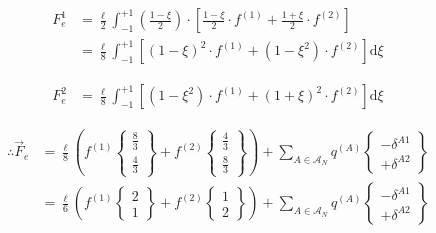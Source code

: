 \begin{equation}%
\begin{aligned}
F_e^1 &= \frac{\ell}{2} \int_{-1}^{+1} \left(\frac{1-\xi}{2}\right) \cdot \left[
	\frac{1-\xi}{2}\cdot f^{(1)}
	+ \frac{1+\xi}{2}\cdot f^{(2)}
\right] \\
&= \frac{\ell}{8} \int_{-1}^{+1} \left[
	\left(1-\xi\right)^2\cdot f^{(1)}
	+ \left(1-\xi^2\right)\cdot f^{(2)}
\right] \text{d} \xi
\end{aligned}
\end{equation}

\begin{equation}%
\begin{aligned}
F_e^2 &= \frac{\ell}{8} \int_{-1}^{+1} \left[
	(1-\xi^2)\cdot f^{(1)} + (1+\xi)^2\cdot f^{(2)}
\right] \text{d}\xi
\end{aligned}
\end{equation}



\begin{equation}%
\begin{aligned}
\therefore \vec{F}_e &= \frac{\ell}{8} \left(
	f^{(1)} \begin{Bmatrix} \frac{8}{3} \\ \frac{4}{3} \end{Bmatrix}
	+ f^{(2)} \begin{Bmatrix} \frac{4}{3} \\ \frac{8}{3} \end{Bmatrix}
\right)
+ \sum_{A \in \mathcal{A}_N} q^{(A)} \begin{Bmatrix} -\delta^{A1} \\ +\delta^{A2} \end{Bmatrix} \\
&= \frac{\ell}{6} \left(
	f^{(1)} \begin{Bmatrix} 2 \\ 1 \end{Bmatrix}
	+ f^{(2)} \begin{Bmatrix} 1 \\ 2 \end{Bmatrix}
\right)
+ \sum_{A \in \mathcal{A}_N} q^{(A)} \begin{Bmatrix} -\delta^{A1} \\ +\delta^{A2} \end{Bmatrix} \\\\
& \text{}
\end{aligned}
\end{equation}


